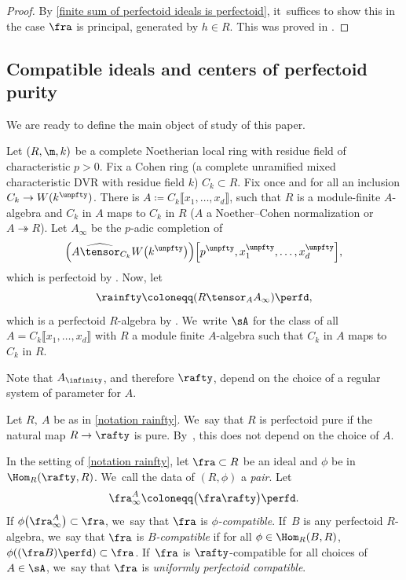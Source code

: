 \begin{proof}
By \autoref{finite sum of perfectoid ideals is perfectoid}, it~suffices to show this in the case $\fra$ is principal, generated by $h\in R$. This was proved in \cite[Lem.\,2.4.3]{CaiLeeMaSchwedeTuckerPerfectoidSignature}.
\end{proof}

\subsection{Compatible ideals and centers of perfectoid purity} We are ready to define the main object of study of this paper.

\begin{notation}\label{notation rainfty}
Let $(R,\m, k)$ be a complete Noetherian local ring with residue field of characteristic $p>0$. Fix a Cohen ring (a complete unramified mixed characteristic DVR with residue field $k$) $C_k\subset R$. Fix once and for all an inclusion $C_k\to W(k^\unpfty)$.
There is $A\coloneqq C_k\llbracket x_1,\ldots,x_d\rrbracket$, such that $R$ is a module-finite $A$-algebra and $C_k$ in $A$ maps to $C_k$ in $R$ (\eg $A$ a Noether--Cohen normalization or $A\twoheadrightarrow R$). Let $A_\infty$ be the $p$-adic completion of
\[
\Bigl(A\widehat{\tensor}_{C_k} W\bigl(k^\unpfty\bigr)\Bigr)\Bigl[p^\unpfty,x_1^\unpfty,\ldots,x_d^\unpfty\Bigr],
\]
which is perfectoid by \cite[Ex.\,3.8\,(4)]{BhattIyengarMaRegularRings}. Now, let
\[
\rainfty\coloneqq (R\tensor_A A_\infty)\perfd,
\]
which is a perfectoid $R$\nobreakdash-algebra by \cite[Th.\,10.11]{BhattScholzePrisms}. We~write $\sA$ for the class of all $A=C_k\llbracket x_1,\ldots,x_d\rrbracket$ with $R$ a module finite $A$-algebra such that $C_k$ in $A$ maps to $C_k$ in $R$.
\end{notation}
\begin{remark}
Note that $A_\infinity$, and therefore $\rafty$, depend on the choice of a regular system of parameter for $A$.
\end{remark}

\begin{definition}
Let $R,\ A$ be as in \autoref{notation rainfty}. We~say that $R$ is perfectoid pure if the natural map $R\to \rafty$ is pure. By~\cite[Lem.\,4.23]{BMPSTWWPerfectoidPure}, this does not depend on the choice of $A$.
\end{definition}

\begin{definition}
In the setting of \autoref{notation rainfty}, let $\fra\subset R$ be an ideal and $\phi$ be in $\Hom_R(\rafty, R)$. We~call the data of $(R,\phi)$ a \emph{pair}.
Let
\[\fra^A_\infty\coloneqq\bigl(\fra\rafty\bigr)\perfd.
\]
If $\phi\bigl(\fra_\infty^A\bigr)\subset \fra$, we~say that
$\fra$ is \emph{$\phi$-compatible}. If~$B$ is any perfectoid $R$\nobreakdash-algebra, we~say that $\fra$ is \emph{$B$-compatible} if for all $\phi\in \Hom_R(B,R)$, $\phi((\fra B)\perfd)\subset \fra$. If~$\fra$ is $\rafty$\nobreakdash-compatible for all choices of $A\in \sA$, we~say that $\fra$ is \emph{uniformly perfectoid compatible}.
\end{definition}

